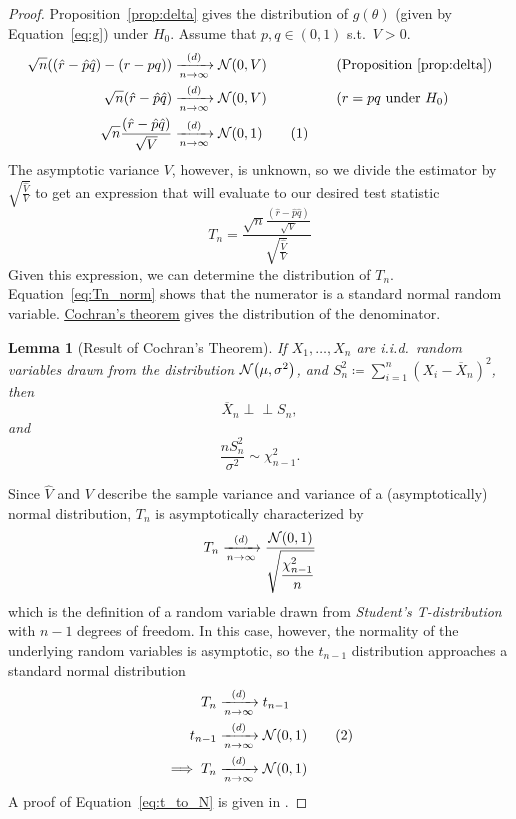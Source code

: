 \documentclass[letterpaper, reqno]{amsart}
\newtheorem{lemma}[theorem]{Lemma}
\numberwithin{equation}{section}
\newcommand{\numberthis}{\addtocounter{equation}{1}\tag{\theequation}}
\newcommand{\ddfrac}[2]{\frac{\displaystyle #1}{\displaystyle #2}}
\newcommand{\N}[2]{\mathcal{N}\mleft( #1, #2 \mright)}
\newcommand{\indep}{\perp \!\!\! \perp}  %
\newcommand{\iid}{i.i.d.}
\newcommand{\sumi}[2]{\sum_{#1=1}^{#2}}
\newcommand{\by}[1]{&\quad&\text{(#1)}}
\newcommand{\Dlim}{\xrightarrow[n \to \infty]{(d)}}
\newcommand{\phat}{\hat{p}}
\newcommand{\qhat}{\hat{q}}
\newcommand{\rhat}{\hat{r}}
\newcommand{\Xnbar}{\overline{X}_n}
\begin{document}
\begin{proof}
  Proposition~\ref{prop:delta} gives the distribution of $g(\theta)$ (given by
  Equation~\eqref{eq:g}) under $H_0$. 
  Assume that $p, q \in (0, 1)$ s.t.\ $V > 0$.
  \begin{alignat*}{3}
  \sqrt{n}\mleft((\rhat - \phat\qhat) - (r - pq)\mright) &\Dlim \N{0}{V}
  \by{Proposition~\ref{prop:delta}} \\
  \sqrt{n}(\rhat - \phat\qhat) &\Dlim \N{0}{V} \by{$r = pq$ under $H_0$} \\
  \sqrt{n}\frac{(\rhat - \phat\qhat)}{\sqrt{V}} &\Dlim \N{0}{1} \numberthis
  \label{eq:Tn_norm}
\end{alignat*}
The asymptotic variance $V$, however, is unknown, so we divide the estimator by
$\sqrt{\frac{\hat{V}}{V}}$ to get an expression that will evaluate to our
desired test statistic
\begin{equation} \label{eq:t1}
  T_n = \ddfrac{\sqrt{n}\frac{(\rhat - \phat\qhat)}{\sqrt{V}}}
               {\sqrt{\frac{\hat{V}}{V}}} 
\end{equation}
Given this expression, we can determine the distribution of $T_n$.
Equation~\eqref{eq:Tn_norm} shows that the numerator is a standard normal random
variable. 
\href{https://en.wikipedia.org/wiki/Cochran's_theorem}{\underline{Cochran's theorem}}
gives the distribution of the denominator.
\begin{lemma}[Result of Cochran's Theorem]
  If $X_1, \dots, X_n$ are \iid\ random variables drawn from the distribution
  $\N{\mu}{\sigma^2}$, and $S_n^2 \coloneqq \sumi{i}{n} (X_i - \Xnbar)^2$,
  then
  \[ \Xnbar \indep S_n, \]
  and
  \[ \frac{n S_n^2}{\sigma^2} \sim \chi^2_{n-1}. \]
\end{lemma}
Since $\hat{V}$ and $V$ describe the sample variance and variance of a
(asymptotically) normal distribution, $T_n$ is asymptotically characterized by
\begin{equation}
  T_n \Dlim \ddfrac{\N{0}{1}}{\sqrt{\frac{\chi^2_{n-1}}{n}}}
\end{equation}
which is the definition of a random variable drawn from \emph{Student's
T-distribution} with $n-1$ degrees of freedom. In this case, however, the
normality of the underlying random variables is asymptotic, so the $t_{n-1}$
distribution approaches a standard normal distribution
\begin{align*}
  T_n &\Dlim t_{n-1} \\
  t_{n-1} &\Dlim \N{0}{1} \numberthis \label{eq:t_to_N} \\
  \implies T_n &\Dlim \N{0}{1} \qedhere
\end{align*}
A proof of Equation~\eqref{eq:t_to_N} is given in .
\end{proof}
\end{document}
